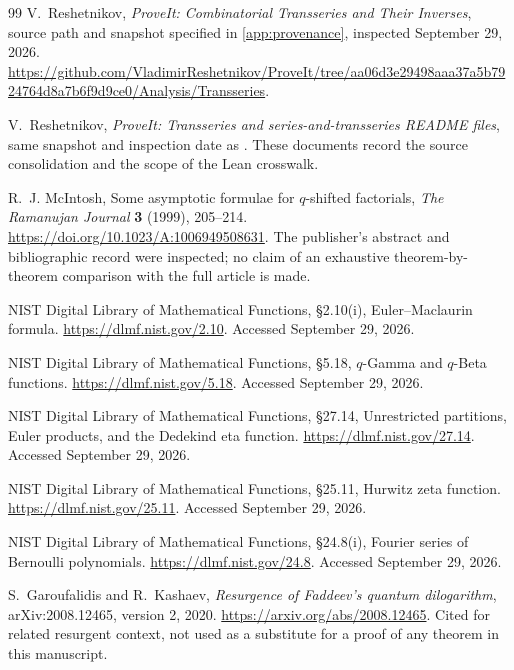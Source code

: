 \documentclass[11pt,a4paper]{article}
\numberwithin{equation}{section}
\theoremstyle{definition}
\begin{document}
\begin{thebibliography}{99}
V.~Reshetnikov, \emph{ProveIt: Combinatorial Transseries and Their Inverses},
source path and snapshot specified in \cref{app:provenance},
inspected September 29, 2026.
\url{https://github.com/VladimirReshetnikov/ProveIt/tree/aa06d3e29498aaa37a5b7924764d8a7b6f9d9ce0/Analysis/Transseries}.

V.~Reshetnikov, \emph{ProveIt: Transseries and series-and-transseries README files},
same snapshot and inspection date as \cite{repo}. These documents record the
source consolidation and the scope of the Lean crosswalk.

R.~J. McIntosh, Some asymptotic formulae for $q$-shifted factorials,
\emph{The Ramanujan Journal} \textbf{3} (1999), 205--214.
\url{https://doi.org/10.1023/A:1006949508631}.
The publisher's abstract and bibliographic record were inspected; no claim
of an exhaustive theorem-by-theorem comparison with the full article is made.

NIST Digital Library of Mathematical Functions, \S2.10(i),
Euler--Maclaurin formula. \url{https://dlmf.nist.gov/2.10}.
Accessed September 29, 2026.

NIST Digital Library of Mathematical Functions, \S5.18,
$q$-Gamma and $q$-Beta functions. \url{https://dlmf.nist.gov/5.18}.
Accessed September 29, 2026.

NIST Digital Library of Mathematical Functions, \S27.14,
Unrestricted partitions, Euler products, and the Dedekind eta function.
\url{https://dlmf.nist.gov/27.14}. Accessed September 29, 2026.

NIST Digital Library of Mathematical Functions, \S25.11,
Hurwitz zeta function. \url{https://dlmf.nist.gov/25.11}.
Accessed September 29, 2026.

NIST Digital Library of Mathematical Functions, \S24.8(i),
Fourier series of Bernoulli polynomials.
\url{https://dlmf.nist.gov/24.8}. Accessed September 29, 2026.

S.~Garoufalidis and R.~Kashaev,
\emph{Resurgence of Faddeev's quantum dilogarithm},
arXiv:2008.12465, version 2, 2020.
\url{https://arxiv.org/abs/2008.12465}.
Cited for related resurgent context, not used as a substitute for a proof of
any theorem in this manuscript.


\end{thebibliography}
\end{document}
